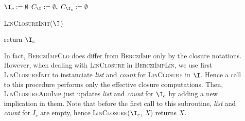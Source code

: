 \begin{algorithm}[H]
	
	\BlankLine
	\BlankLine
	
	$\I_c := \emptyset$ \;
	$C_{\I} := \emptyset, \; C_{\I_c} := \emptyset $ \;
	
	\textsc{LinClosureInit}($\I$) \;
	
	
	\BlankLine
	
	
	\BlankLine
	
	return $\I_c$ \;
	
	\label{alg:BercziImpLin}
\end{algorithm}

\vspace{1.2em}

In fact, \textsc{BercziImpClo} does differ from \textsc{BercziImp} only by the closure notations. However, when dealing with \textsc{LinClosure} in \textsc{BercziImpLin}, we use first \textsc{LinClosureInit} to instanciate 
\textit{list} and \textit{count} for \textsc{LinClosure} in $\I$. Hence a call
to this procedure performs only the effective closure computations. Then, 
\textsc{LinClosureAddImp} just updates \textit{list} and \textit{count} for $\I_c$ by adding a new implication in them. Note that before the first call to
this subroutine, \textit{list} and \textit{count} for $I_c$ are empty, hence
\textsc{LinClosure}($\I_c$, $X$) returns $X$.

\vspace{1.2em}

